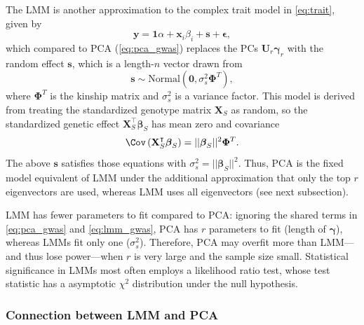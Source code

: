 \documentclass[11pt]{article}
\begin{document}
The LMM is another approximation to the complex trait model in \cref{eq:trait}, given by
\begin{equation}
  \label{eq:lmm_gwas}
  \mathbf{y}
  =
  \mathbf{1} \alpha + \mathbf{x}_i \beta_i + \mathbf{s} + \boldsymbol{\epsilon}
  ,
\end{equation}
which compared to PCA (\cref{eq:pca_gwas}) replaces the PCs $\mathbf{U}_r \boldsymbol{\gamma}_r$ with the random effect $\mathbf{s}$, which is a length-$n$ vector drawn from \citep{sul_population_2018}
$$
\mathbf{s} \sim \text{Normal} \left( \mathbf{0}, \sigma^2_s \mathbf{\Phi}^T \right),
$$
where $\mathbf{\Phi}^T$ is the kinship matrix and $\sigma^2_s$ is a variance factor.
This model is derived from treating the standardized genotype matrix $\mathbf{X}_S$ as random, so the standardized genetic effect
$\mathbf{X}_S^\intercal \boldsymbol{\beta}_S$
has mean zero and covariance
$$
\Cov \left( \mathbf{X}_S^\intercal \boldsymbol{\beta}_S \right)
=
|| \boldsymbol{\beta}_S ||^2 \mathbf{\Phi}^T
.
$$
The above $\mathbf{s}$ satisfies those equations with $\sigma^2_s = || \boldsymbol{\beta}_S ||^2$.
Thus, PCA is the fixed model equivalent of LMM under the additional approximation that only the top $r$ eigenvectors are used, whereas LMM uses all eigenvectors (see next subsection).

LMM has fewer parameters to fit compared to PCA: ignoring the shared terms in \cref{eq:pca_gwas} and \cref{eq:lmm_gwas}, PCA has $r$ parameters to fit (length of $\boldsymbol{\gamma}$), whereas LMMs fit only one ($\sigma^2_s$).
Therefore, PCA may overfit more than LMM---and thus lose power---when $r$ is very large and the sample size small.
Statistical significance in LMMs most often employs a likelihood ratio test, whose test statistic has a asymptotic $\chi^2$ distribution under the null hypothesis.

\subsubsection{Connection between LMM and PCA}
\end{document}
